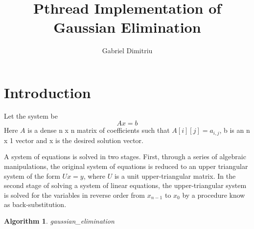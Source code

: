 \documentclass[a4paper]{article}
\newtheorem{algorithm}[theorem]{Algorithm}
\begin{document}
\title{Pthread Implementation of Gaussian Elimination}
\date{}
\author{Gabriel Dimitriu}
\maketitle

\section{Introduction}

Let the system be 
\begin{equation}
Ax=b  \label{s1}
\end{equation}%
\qquad \qquad Here $A$ is a dense n x n matrix of coefficients such that $%
A[i][j]=a_{i,j}$, b is an n x 1 vector and x is the desired solution vector.

A system of equations is solved in two stages. First, through a series of
algebraic manipulations, the original system of equations is reduced to an
upper triangular system of the form $Ux=y$, where $U$ is a unit
upper-triangular matrix. In the second stage of solving a system of linear
equations, the upper-triangular system is solved for the variables in
reverse order from $x_{n-1}$ to $x_{0}$ by a procedure know as
back-substitution.

\begin{algorithm}
gaussian\_elimination
\end{algorithm}
\end{document}
